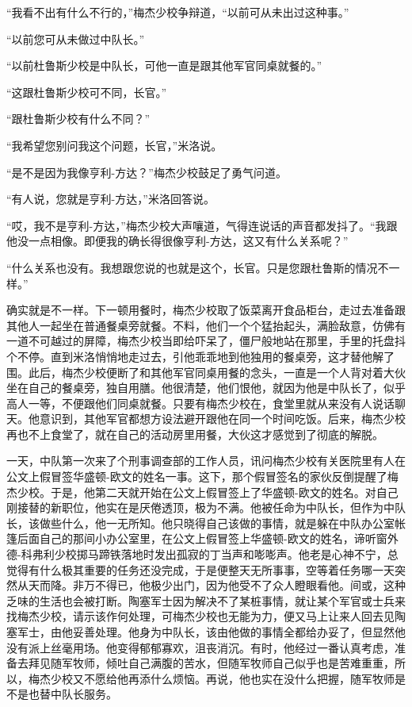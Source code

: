     “我看不出有什么不行的，”梅杰少校争辩道，“以前可从未出过这种事。”

    “以前您可从未做过中队长。”

    “以前杜鲁斯少校是中队长，可他一直是跟其他军官同桌就餐的。”

    “这跟杜鲁斯少校可不同，长官。”

    “跟杜鲁斯少校有什么不同？”

    “我希望您别问我这个问题，长官，”米洛说。

    “是不是因为我像亨利-方达？”梅杰少校鼓足了勇气问道。

    “有人说，您就是亨利-方达，”米洛回答说。

    “哎，我不是亨利-方达，”梅杰少校大声嚷道，气得连说话的声音都发抖了。“我跟他没一点相像。即便我的确长得很像亨利-方达，这又有什么关系呢？”

    “什么关系也没有。我想跟您说的也就是这个，长官。只是您跟杜鲁斯的情况不一样。”

    确实就是不一样。下一顿用餐时，梅杰少校取了饭菜离开食品柜台，走过去准备跟其他人一起坐在普通餐桌旁就餐。不料，他们一个个猛抬起头，满脸敌意，仿佛有一道不可越过的屏障，梅杰少校当即给吓呆了，僵尸般地站在那里，手里的托盘抖个不停。直到米洛悄悄地走过去，引他乖乖地到他独用的餐桌旁，这才替他解了围。此后，梅杰少校便断了和其他军官同桌用餐的念头，一直是一个人背对着大伙坐在自己的餐桌旁，独自用膳。他很清楚，他们恨他，就因为他是中队长了，似乎高人一等，不便跟他们同桌就餐。只要有梅杰少校在，食堂里就从来没有人说话聊天。他意识到，其他军官都想方设法避开跟他在同一个时间吃饭。后来，梅杰少校再也不上食堂了，就在自己的活动房里用餐，大伙这才感觉到了彻底的解脱。

    一天，中队第一次来了个刑事调查部的工作人员，讯问梅杰少校有关医院里有人在公文上假冒签华盛顿-欧文的姓名一事。这下，那个假冒签名的家伙反倒提醒了梅杰少校。于是，他第二天就开始在公文上假冒签上了华盛顿-欧文的姓名。对自己刚接替的新职位，他实在是厌倦透顶，极为不满。他被任命为中队长，但作为中队长，该做些什么，他一无所知。他只晓得自己该做的事情，就是躲在中队办公室帐篷后面自己的那间小办公室里，在公文上假冒签上华盛顿-欧文的姓名，谛听窗外德-科弗利少校掷马蹄铁落地时发出孤寂的丁当声和嘭嘭声。他老是心神不宁，总觉得有什么极其重要的任务还没完成，于是便整天无所事事，空等着任务哪一天突然从天而降。非万不得已，他极少出门，因为他受不了众人瞪眼看他。间或，这种乏味的生活也会被打断。陶塞军士因为解决不了某桩事情，就让某个军官或士兵来找梅杰少校，请示该作何处理，可梅杰少校也无能为力，便又马上让来人回去见陶塞军士，由他妥善处理。他身为中队长，该由他做的事情全都给办妥了，但显然他没有派上丝毫用场。他变得郁郁寡欢，沮丧消沉。有时，他经过一番认真考虑，准备去拜见随军牧师，倾吐自己满腹的苦水，但随军牧师自己似乎也是苦难重重，所以，梅杰少校又不愿给他再添什么烦恼。再说，他也实在没什么把握，随军牧师是不是也替中队长服务。

